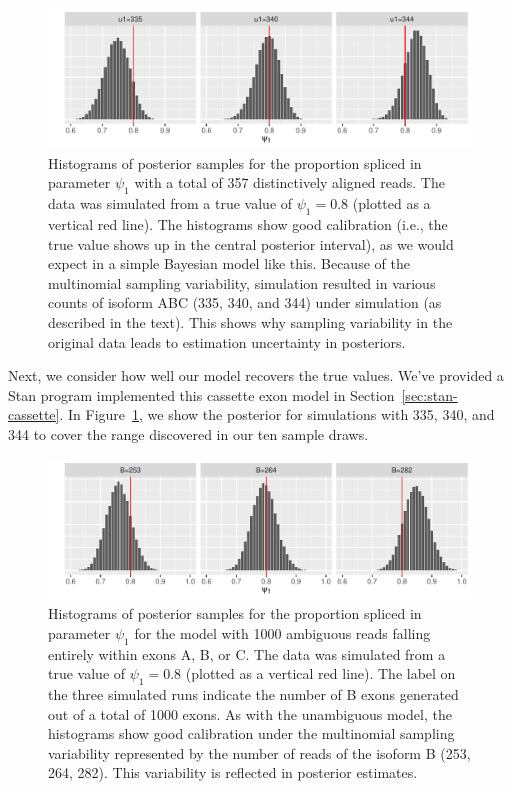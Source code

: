 \documentclass[11pt]{report}
\newcommand{\mycaption}[2]{\caption{#2}\label{#1}}
\begin{document}
\begin{figure}[t!]
  \begin{center}
    \includegraphics[width=\textwidth]{img/cassette-posterior.pdf}
  \end{center}
  \mycaption{figure:cassette_histos}{Histograms of posterior samples
    for the proportion spliced in parameter $\psi_1$ with a total of
    357 distinctively aligned reads.  The data was simulated from a
    true value of $\psi_1 = 0.8$ (plotted as a vertical red line). The
    histograms show good calibration (i.e., the true value shows up in
    the central posterior interval), as we would expect in a simple
    Bayesian model like this.  Because of the multinomial sampling
    variability, simulation resulted in various counts of isoform ABC
    (335, 340, and 344) under simulation (as described in the text).
    This shows why sampling variability in the original data leads to
    estimation uncertainty in posteriors.}
\end{figure}
%
Next, we consider how well our model recovers the true values.  We've
provided a Stan program implemented this cassette exon model in
Section~\ref{sec:stan-cassette}.  In Figure~\ref{figure:cassette_histos},
we show the posterior for simulations with 335, 340, and 344 to cover
the range discovered in our ten sample draws.



\begin{figure}[t!]
  \begin{center}
    \includegraphics[width=\textwidth]{img/cassette-ambig-posterior.pdf}
  \end{center}
  \mycaption{figure:cassette_histos_ambig}{Histograms of posterior
    samples for the proportion spliced in parameter $\psi_1$ for the
    model with 1000 ambiguous reads falling entirely within exons A,
    B, or C.  The data was simulated from a true value of
    $\psi_1 = 0.8$ (plotted as a vertical red line). The label on the
    three simulated runs indicate the number of B exons generated out
    of a total of 1000 exons.  As with the unambiguous model, the
    histograms show good calibration under the multinomial sampling
    variability represented by the number of reads of the isoform B
    (253, 264, 282).  This variability is reflected in posterior
    estimates.}
\end{figure}
%
\end{document}
